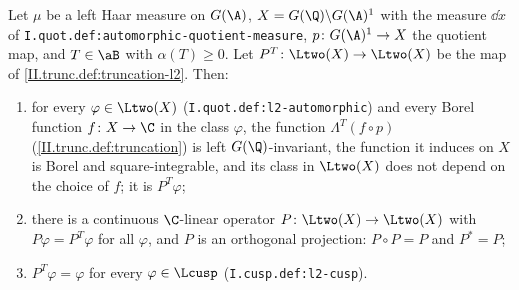 Let $\mu$ be a left Haar measure on $G(\A)$, $X=G(\Q)\backslash G(\A)^1$ with the measure $\dd\dot x$ of \texttt{I.quot.def:automorphic-quotient-measure}, $p\colon G(\A)^1\to X$
the quotient map, and $T\in\aB$ with $\alpha(T)\ge0$. Let $P^T\colon\Ltwo(X)\to\Ltwo(X)$ be the map of \cref{II.trunc.def:truncation-l2}. Then:
\begin{enumerate}
  \item[(a)] for every $\varphi\in\Ltwo(X)$ (\texttt{I.quot.def:l2-automorphic}) and every Borel function $f\colon X\to\C$ in the class $\varphi$, the function
  $\Lambda^T(f\circ p)$ (\cref{II.trunc.def:truncation}) is left $G(\Q)$-invariant, the function it induces on $X$ is Borel and square-integrable, and its class in
  $\Ltwo(X)$ does not depend on the choice of $f$; it is $P^T\varphi$;
  \item[(b)] there is a continuous $\C$-linear operator $P\colon\Ltwo(X)\to\Ltwo(X)$ with $P\varphi=P^T\varphi$ for all $\varphi$, and $P$ is an orthogonal projection:
  $P\circ P=P$ and $P^*=P$;
  \item[(c)] $P^T\varphi=\varphi$ for every $\varphi\in\Lcusp$ (\texttt{I.cusp.def:l2-cusp}).
\end{enumerate}
